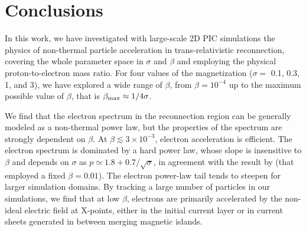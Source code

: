 

\section{Conclusions}\label{conclusions}
In this work, we have investigated with large-scale 2D PIC simulations the physics of non-thermal particle acceleration in trans-relativistic  reconnection, covering the whole parameter space in $\sigma$ and $\beta$ and employing the physical proton-to-electron mass ratio. For four values of the magnetization ($\sigma=$ 0.1, 0.3, 1, and 3), we have explored a wide range of $\beta$, from $\beta=10^{-4}$ up to the maximum possible value of $\beta$, that is $\beta_{\rm max}\approx 1/4\sigma$. 



We find that the electron spectrum in the reconnection region can be generally modeled as a non-thermal power law, but the properties of the spectrum are strongly dependent on $\beta$. At $\beta \lesssim 3 \times 10^{-3}$, electron acceleration is efficient. The electron spectrum is dominated by a hard power law, whose slope is insensitive to $\beta$ and depends on $\sigma$ as $p\simeq 1.8 +0.7/\sqrt{\sigma}$, in agreement with the result by \citet{werner2018} (that employed a fixed $\beta=0.01$). The electron power-law tail tends to steepen for larger simulation domains. By tracking a large number of particles in our simulations, we find that at low $\beta$, electrons are primarily accelerated by the non-ideal electric field at X-points, either  in the initial current layer  or in current sheets generated in between merging magnetic islands. 


